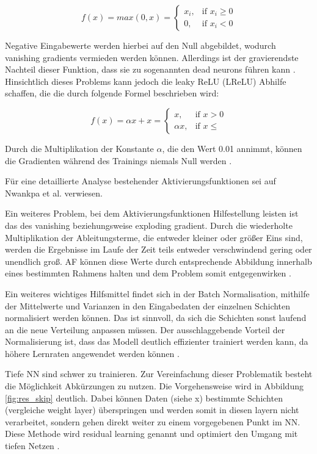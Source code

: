\documentclass[12pt,a4paper]{article}
\begin{document}
\begin{equation}
 f(x) = max (0, x) = 
\begin{cases}
      x_i, & \text{if $x_i \geq 0$}\\
      0, & \text{if $x_i<0$}
    \end{cases}
\end{equation}

Negative Eingabewerte werden hierbei auf den Null abgebildet, wodurch vanishing gradients vermieden werden können. Allerdings ist der gravierendste Nachteil dieser Funktion, dass sie zu sogenannten dead neurons führen kann \cite{Nwankpa2018}. 
Hinsichtlich dieses Problems kann jedoch die leaky ReLU (LReLU) Abhilfe schaffen, die die durch folgende Formel beschrieben wird:

\begin{equation}
 f(x) = \alpha x + x = 
\begin{cases}
      x, & \text{if $x > 0$}\\
      \alpha x, & \text{if $x \leq $}
    \end{cases}
\end{equation}

Durch die Multiplikation der Konstante $\alpha$, die den Wert 0.01 annimmt, können die Gradienten während des Trainings niemals Null werden \cite{Nwankpa2018}.

Für eine detaillierte Analyse bestehender Aktivierungsfunktionen sei auf Nwankpa et al. \cite{Nwankpa2018} verwiesen.

Ein weiteres Problem, bei dem Aktivierungsfunktionen Hilfestellung leisten ist das des vanishing beziehungsweise exploding gradient. Durch die wiederholte Multiplikation der Ableitungsterme, die entweder kleiner oder größer Eins sind, werden die Ergebnisse im Laufe der Zeit teils entweder verschwindend gering oder unendlich groß. AF können diese Werte durch entsprechende Abbildung innerhalb eines bestimmten Rahmens halten und dem Problem somit entgegenwirken \cite{Nwankpa2018}.

Ein weiteres wichtiges Hilfsmittel findet sich in der Batch Normalisation, mithilfe der Mittelwerte und Varianzen in den Eingabedaten der einzelnen Schichten normalisiert werden können. Das ist sinnvoll, da sich die Schichten sonst laufend an die neue Verteilung anpassen müssen. Der ausschlaggebende Vorteil der Normalisierung ist, dass das Modell deutlich effizienter trainiert werden kann, da höhere Lernraten angewendet werden können  \cite{Ioffe2015}.

Tiefe NN sind schwer zu trainieren. Zur Vereinfachung dieser Problematik besteht die Möglichkeit Abkürzungen zu nutzen. Die Vorgehensweise wird in Abbildung \ref{fig:res_skip} deutlich. Dabei können Daten (siehe \glqq{}x\grqq) bestimmte Schichten (vergleiche \glqq{}weight layer\grqq) überspringen und werden somit in diesen layern nicht verarbeitet, sondern gehen direkt weiter zu einem vorgegebenen Punkt im NN. Diese Methode wird \glqq{}residual learning\grqq{} genannt und optimiert den Umgang mit tiefen Netzen \cite{He2016}.
\end{document}
